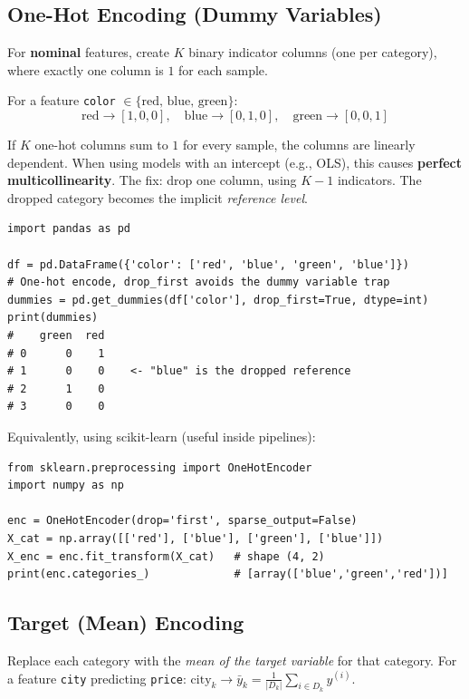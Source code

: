 \subsection*{One-Hot Encoding (Dummy Variables)}

For \textbf{nominal} features, create $K$ binary indicator columns (one per category), where exactly one column is $1$ for each sample.

For a feature \texttt{color} $\in \{\text{red, blue, green}\}$:
$$\text{red} \to [1,0,0], \quad \text{blue} \to [0,1,0], \quad \text{green} \to [0,0,1]$$

\begin{remark}
If $K$ one-hot columns sum to $1$ for every sample, the columns are linearly dependent. When using models with an intercept (e.g., OLS), this causes \textbf{perfect multicollinearity}. The fix: drop one column, using $K-1$ indicators. The dropped category becomes the implicit \emph{reference level}.
\end{remark}

\begin{lstlisting}[style=pythonstyle]
import pandas as pd

df = pd.DataFrame({'color': ['red', 'blue', 'green', 'blue']})
# One-hot encode, drop_first avoids the dummy variable trap
dummies = pd.get_dummies(df['color'], drop_first=True, dtype=int)
print(dummies)
#    green  red
# 0      0    1
# 1      0    0    <- "blue" is the dropped reference
# 2      1    0
# 3      0    0
\end{lstlisting}

Equivalently, using scikit-learn (useful inside pipelines):

\begin{lstlisting}[style=pythonstyle]
from sklearn.preprocessing import OneHotEncoder
import numpy as np

enc = OneHotEncoder(drop='first', sparse_output=False)
X_cat = np.array([['red'], ['blue'], ['green'], ['blue']])
X_enc = enc.fit_transform(X_cat)   # shape (4, 2)
print(enc.categories_)             # [array(['blue','green','red'])]
\end{lstlisting}

\subsection*{Target (Mean) Encoding}

Replace each category with the \emph{mean of the target variable} for that category. For a feature \texttt{city} predicting \texttt{price}: $\text{city}_k \to \bar{y}_k = \frac{1}{|D_k|}\sum_{i \in D_k} y^{(i)}$.

